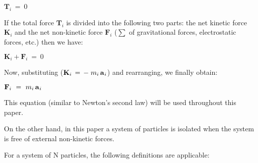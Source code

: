 \documentclass[10pt]{article}
\begin{document}
\par \bigskip ${\mathbf{T}}_i ~=~ 0$

\par \bigskip \noindent If the total force ${\mathbf{T}}_i$ is divided into the following two parts: the net kinetic force ${\mathbf{K}}_{i}$ and the net non-kinetic force ${\mathbf{F}}_{i}$ (\hspace{+0.180em}$\sum$ of gravitational forces, electrostatic forces, etc.\hspace{+0.180em}) then we \hbox{have\hspace{+0.060em}:}

\par \bigskip ${\mathbf{K}}_{i} + {\mathbf{F}}_{i} ~=~ 0$

\par \bigskip \noindent Now, substituting (\hspace{+0.180em}${\mathbf{K}}_{i} \,=\, - \; m_i \, {\mathbf{a}}_{\hspace{+0.045em}i}$\hspace{+0.180em}) and rearranging, we finally obtain:

\par \bigskip ${\mathbf{F}}_{i} ~=~ m_i \, {\mathbf{a}}_{\hspace{+0.045em}i}$

\par \bigskip \noindent This equation (\hspace{+0.180em}similar to Newton's second law\hspace{+0.180em}) will be used throughout this paper.

\par \bigskip \noindent On the other hand, in this paper a system of particles is isolated when the system is free of external non-kinetic forces.

\newpage

\par {}

\par \bigskip \noindent For a system of N particles, the following definitions are applicable:
\end{document}
